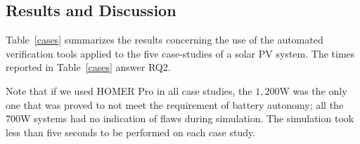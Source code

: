 \documentclass[review]{elsarticle}
\begin{document}
\subsection{Results and Discussion}
\label{sec:results_indeed}
%
%
Table~\ref{cases} summarizes the results concerning the use of the automated verification tools applied to the five case-studies of a solar PV system. The times reported in Table~\ref{cases} answer RQ2. 

Note that if we used HOMER Pro in all case studies, the $1,200$W was the only one that was proved to not meet the requirement of battery autonomy; all the 700W systems had no indication of flaws during simulation. The simulation took less than five seconds to be performed on each case study.
\end{document}
